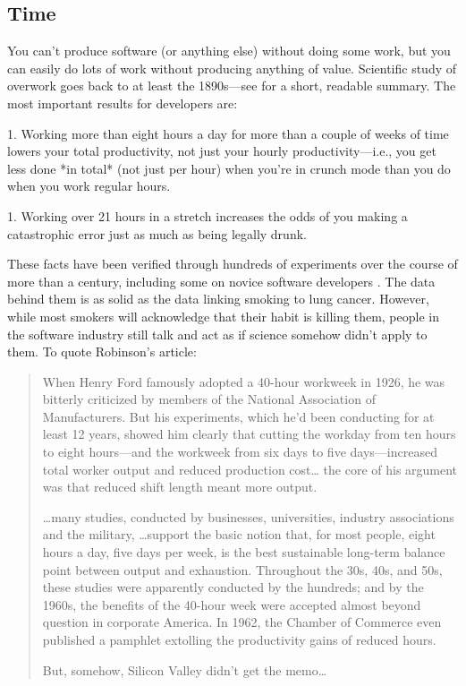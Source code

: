 \documentclass[10pt,letterpaper]{article}
\begin{document}
\subsection*{Time}

You can't produce software (or anything else) without doing some work,
but you can easily do lots of work without producing anything of
value.  Scientific study of overwork goes back to at least the
1890s---see \cite{Robinson2005} for a short, readable summary.  The
most important results for developers are:

1.  Working more than eight hours a day for more than a couple of
    weeks of time lowers your total productivity, not just your hourly
    productivity---i.e., you get less done *in total* (not just per hour)
    when you're in crunch mode than you do when you work regular hours.

1.  Working over 21 hours in a stretch increases the odds of you making a
    catastrophic error just as much as being legally drunk.

These facts have been verified through hundreds of experiments over the course
of more than a century, including some on novice software developers
\cite{Fucci2020}.  The data behind them is as solid as the data linking
smoking to lung cancer.  However, while most smokers will acknowledge that their
habit is killing them, people in the software industry still talk and act as if
science somehow didn't apply to them.  To quote Robinson's article:

\begin{quotation}

  When Henry Ford famously adopted a 40-hour workweek in 1926, he was
  bitterly criticized by members of the National Association of
  Manufacturers.  But his experiments, which he'd been conducting for
  at least 12 years, showed him clearly that cutting the workday from
  ten hours to eight hours---and the workweek from six days to five
  days---increased total worker output and reduced production cost{\ldots}
  the core of his argument was that reduced shift length meant more
  output.

  {\ldots}many studies, conducted by businesses, universities,
  industry associations and the military, {\ldots}support the basic
  notion that, for most people, eight hours a day, five days per week,
  is the best sustainable long-term balance point between output and
  exhaustion.  Throughout the 30s, 40s, and 50s, these studies were
  apparently conducted by the hundreds; and by the 1960s, the benefits
  of the 40-hour week were accepted almost beyond question in
  corporate America.  In 1962, the Chamber of Commerce even published
  a pamphlet extolling the productivity gains of reduced hours.

  But, somehow, Silicon Valley didn't get the memo{\ldots}

\end{quotation}
\end{document}
